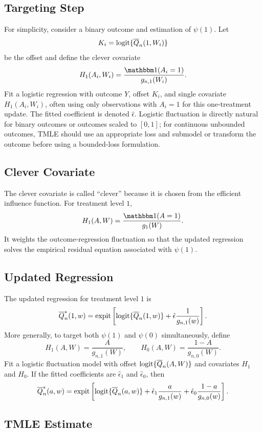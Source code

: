 \subsection{Targeting Step}

For simplicity, consider a binary outcome and estimation of $\psi(1)$. Let
\[
K_i=\operatorname{logit}\{\overline{Q}_n(1,W_i)\}
\]
be the offset and define the clever covariate
\[
H_1(A_i,W_i)=\frac{\ind(A_i=1)}{g_{n,1}(W_i)}.
\]
Fit a logistic regression with outcome $Y$, offset $K_i$, and single covariate
$H_1(A_i,W_i)$, often using only observations with $A_i=1$ for this one-treatment
update. The fitted coefficient is denoted $\hat\epsilon$. Logistic fluctuation is
directly natural for binary outcomes or outcomes scaled to $[0,1]$; for
continuous unbounded outcomes, TMLE should use an appropriate loss and submodel
or transform the outcome before using a bounded-loss formulation.

\subsection{Clever Covariate}

The clever covariate is called ``clever'' because it is chosen from the efficient
influence function. For treatment level $1$,
\[
H_1(A,W)=\frac{\ind(A=1)}{g_1(W)}.
\]
It weights the outcome-regression fluctuation so that the updated regression solves
the empirical residual equation associated with $\psi(1)$.

\subsection{Updated Regression}

The updated regression for treatment level $1$ is
\[
\overline{Q}_n^*(1,w)
=
\operatorname{expit}\left[
\operatorname{logit}\{\overline{Q}_n(1,w)\}
+
\hat\epsilon\frac{1}{g_{n,1}(w)}
\right].
\]
More generally, to target both $\psi(1)$ and $\psi(0)$ simultaneously, define
\[
H_1(A,W)=\frac{A}{g_{n,1}(W)},\qquad
H_0(A,W)=\frac{1-A}{g_{n,0}(W)}.
\]
Fit a logistic fluctuation model with offset $\operatorname{logit}\{\overline{Q}_n(A,W)\}$ and covariates
$H_1$ and $H_0$. If the fitted coefficients are $\hat\epsilon_1$ and
$\hat\epsilon_0$, then
\[
\overline{Q}_n^*(a,w)
=
\operatorname{expit}\left[
\operatorname{logit}\{\overline{Q}_n(a,w)\}
+
\hat\epsilon_1\frac{a}{g_{n,1}(w)}
+
\hat\epsilon_0\frac{1-a}{g_{n,0}(w)}
\right].
\]

\subsection{TMLE Estimate}

